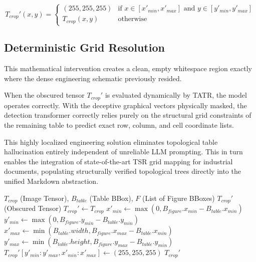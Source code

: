 \begin{equation}
T_{crop}'(x,y) = 
\begin{cases} 
(255, 255, 255) & \text{if } x \in [x'_{min}, x'_{max}] \text{ and } y \in [y'_{min}, y'_{max}] \\
T_{crop}(x,y) & \text{otherwise}
\end{cases}
\end{equation}

\subsection{Deterministic Grid Resolution}
This mathematical intervention creates a clean, empty whitespace region exactly where the dense engineering schematic previously resided. 

When the obscured tensor $T_{crop}'$ is evaluated dynamically by TATR, the model operates correctly. With the deceptive graphical vectors physically masked, the detection transformer correctly relies purely on the structural grid constraints of the remaining table to predict exact row, column, and cell coordinate lists. 

This highly localized engineering solution eliminates topological table hallucination entirely independent of unreliable LLM prompting. This in turn enables the integration of state-of-the-art TSR grid mapping for industrial documents, populating structurally verified topological trees directly into the unified Markdown abstraction.

\begin{algorithm}[H]
\caption{Semantic Pre-Masking for TATR Interference}
\label{alg:semantic_masking_logic}
\begin{algorithmic}[1]
\REQUIRE $T_{crop}$ (Image Tensor), $B_{table}$ (Table BBox), $F$ (List of Figure BBoxes)
\ENSURE $T_{crop}'$ (Obscured Tensor)
\STATE $T_{crop}' \leftarrow T_{crop}$
        \STATE $x'_{min} \leftarrow \max(0, B_{figure}.x_{min} - B_{table}.x_{min})$
        \STATE $y'_{min} \leftarrow \max(0, B_{figure}.y_{min} - B_{table}.y_{min})$
        \STATE $x'_{max} \leftarrow \min(B_{table}.width, B_{figure}.x_{max} - B_{table}.x_{min})$
        \STATE $y'_{max} \leftarrow \min(B_{table}.height, B_{figure}.y_{max} - B_{table}.y_{min})$
        \STATE $T_{crop}'[y'_{min}:y'_{max}, x'_{min}:x'_{max}] \leftarrow (255, 255, 255)$
    \ENDIF
\ENDFOR
\RETURN $T_{crop}'$
\end{algorithmic}
\end{algorithm}

